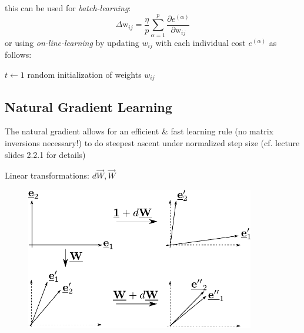 this can be used for \emph{batch-learning}:
\begin{equation}
	\Delta \mathrm{w}_{ij}
	= \frac{\eta}{p} \sum\limits_{\alpha = 1}^p 
	\frac{\partial e^{(\alpha)}}{\partial \mathrm{w}_{ij}}
\end{equation}
or using \emph{on-line-learning} by updating $w_{ij}$ with each individual cost $e^{(\alpha)}$ as follows:
\begin{algorithm}[ht]
  \DontPrintSemicolon
  $t \leftarrow 1$\;
  random initialization of weights $w_{ij}$\;
\label{alg:onlineGD}
\end{algorithm}

\clearpage

\subsection{Natural Gradient Learning}
The natural gradient allows for an efficient \& fast learning rule (no matrix inversions
  necessary!) to do steepest ascent under normalized step size (cf. lecture slides 2.2.1 for details)

Linear transformations: $d \vec{W}, \vec{W}$
\begin{figure}[h]
  \centering
\includegraphics[width=10cm]{img/section2_fig18}  
  \label{fig:NatGrad}
\end{figure}


\newpage

